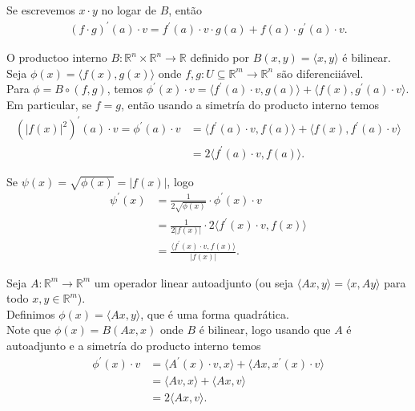 \begin{note}
  Se escrevemos $x\cdot y$ no logar de $B$, então
  \begin{align*}
    (f\cdot g)^{\prime}(a)\cdot v=f^{\prime}(a)\cdot v\cdot g(a)+f(a)\cdot g^{\prime}(a)\cdot v.
  \end{align*}
\end{note}
\begin{example}
  O productoo interno $B:\mathbb{R}^{n}\times\mathbb{R}^{n}\to\mathbb{R}$ definido por $B(x,y)=\langle x,y \rangle$ é bilinear.\\
  Seja $\phi(x)=\langle f(x),g(x) \rangle$ onde $f,g:U\subseteq\mathbb{R}^{m}\to\mathbb{R}^{n}$ são diferenciiável.\\
  Para $\phi=B\circ (f,g)$, temos $\phi^{\prime}(x)\cdot v=\langle f^{\prime}(a)\cdot v,g(a) \rangle+\langle f(x),g^{\prime}(a)\cdot v\rangle$.\\
  Em particular, se $f=g$, então usando a simetría do producto interno temos
  \begin{align*}
    \left( |f(x)|^{2} \right)^{\prime}(a)\cdot v=\phi^{\prime}(a)\cdot v&=\langle f^{\prime}(a)\cdot v,f(a) \rangle+\langle f(x),f^{\prime}(a)\cdot v\rangle\\
    &=2\langle f^{\prime}(a)\cdot v,f(a) \rangle.
  \end{align*}
\end{example}
\begin{note}
  Se $\psi(x)=\sqrt{\phi(x)}=|f(x)|$, logo
  \begin{align*}
    \psi^{\prime}(x)&=\frac{1}{2\sqrt{\phi(x)}}\cdot \phi^{\prime}(x)\cdot v\\
    &=\frac{1}{2|f(x)|}\cdot 2\langle f^{\prime}(x)\cdot v,f(x)\rangle\\
    &=\frac{\langle f^{\prime}(x)\cdot v,f(x) \rangle}{|f(x)|}.
  \end{align*}
\end{note}
\begin{example}
  Seja $A:\mathbb{R}^{m}\to\mathbb{R}^{m}$ um operador linear autoadjunto (ou seja $\langle Ax,y\rangle=\langle x,Ay \rangle$ para todo $x,y\in\mathbb{R}^{m}$).\\
  Definimos $\phi(x)=\langle Ax,y \rangle$, que é uma forma quadrática.\\
  Note que $\phi(x)=B(Ax,x)$ onde $B$ é bilinear, logo usando que $A$ é autoadjunto e a simetría do producto interno temos 
  \begin{align*}
    \phi^{\prime}(x)\cdot v&=\langle A^{\prime}(x)\cdot v,x \rangle+\langle Ax,x^{\prime}(x)\cdot v \rangle\\
    &=\langle Av,x\rangle+\langle Ax,v \rangle\\
    &=2\langle Ax,v \rangle.
  \end{align*}
\end{example}
